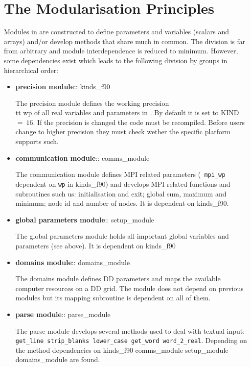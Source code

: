 \section{The \D Modularisation Principles}
\label{modularisation-principles}

Modules in \D are constructed to define parameters and variables
(scalars and arrays) and/or develop methods that share much in
common.  The division is far from arbitrary and module
interdependence is reduced to minimum.  However, some dependencies
exist which leads to the following division by groups in
hierarchical order:
\begin{itemize}

\item {\bf precision module}:: {\sc kinds\_f90}

The precision module defines the working precision {\\tt wp} of
all real variables and parameters in \D.  By default it is set to
KIND~$=~16$.  If the precision is changed the code must be
recompiled.  Before users change to higher precision they must
check wether the specific platform supports such.

\item {\bf communication module}:: {\sc comms\_module}

The communication module defines MPI related parameters ({\tt
mpi\_wp} dependent on {\tt wp} in {\sc kinds\_f90}) and develops
MPI related functions and subroutines such us: initialisation and
exit; global sum, maximum and minimum; node id and number of
nodes.  It is dependent on {\sc kinds\_f90}.

\item {\bf global parameters module}:: {\sc setup\_module}

The global parameters module holds all important global variables
and parameters (see above).  It is dependent on {\sc kinds\_f90}

\item {\bf domains module}:: {\sc domains\_module}

The domains module defines DD parameters and maps the available
computer resources on a DD grid.  The module does not depend on
previous modules but its mapping subroutine is dependent on all of
them.

\item {\bf parse module}:: {\sc parse\_module}

The parse module develops several methods used to deal with
textual input: {\tt get\_line strip\_blanks lower\_case get\_word
word\_2\_real}.  Depending on the method dependencies on {\sc
kinds\_f90 comms\_module setup\_module domains\_module} are found.


\end{itemize}
